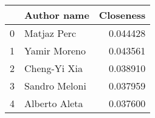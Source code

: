 \begin{tabular}{llr}
\toprule
{} &    Author name &  Closeness \\
\midrule
0 &    Matjaz Perc &   0.044428 \\
1 &   Yamir Moreno &   0.043561 \\
2 &   Cheng-Yi Xia &   0.038910 \\
3 &  Sandro Meloni &   0.037959 \\
4 &  Alberto Aleta &   0.037600 \\
\bottomrule
\end{tabular}
